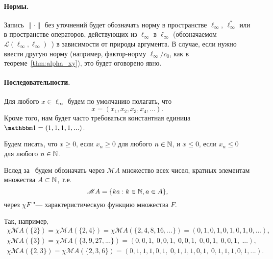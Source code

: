 \paragraph{Нормы.}
Запись $\|\cdot\|$ без уточнений будет обозначать норму в пространстве $\ell_\infty$, $\ell_\infty^*$
или в пространстве операторов, действующих из $\ell_\infty$ в $\ell_\infty$ (обозначаемом $\mathcal L (\ell_\infty, \ell_\infty)$~)
в зависимости от природы аргумента.
В случае, если нужно ввести другую норму (например, фактор-норму $\ell_\infty / c_0$, как в теореме~\ref{thm:alpha_xy}),
это будет оговорено явно.


\paragraph{Последовательности.}
Для любого $x\in\ell_\infty$ будем по умолчанию полагать, что
\begin{equation}
	x=(x_1, x_2, x_3, x_4, ...)
	.
\end{equation}
Кроме того, нам будет часто требоваться константная единица $\one = (1, 1, 1, 1, ...)$.

Будем писать, что $x\geq 0$, если $x_n \geq 0$ для любого $n\in \mathbb{N}$, и $x\leq 0$, если $x_n \leq 0$ для любого $n\in \mathbb{N}$.

Вслед за~\cite{hall1992behrend} будем обозначать через $\mathscr{M}A$ множество всех чисел,
кратных элементам множества $A\subset\mathbb{N}$, т.е.
\begin{equation}
	\mathscr{M}A = \{ka: k\in\mathbb{N}, a\in A\}
	,
\end{equation}
через $\chi F$ "--- характеристическую функцию множества $F$.

Так, например,
\begin{gather}
	\chi \mathscr{M}\!A(\{2\}) = \chi \mathscr{M}\!A(\{2, 4\}) = \chi \mathscr{M}\!A(\{2,4,8,16,...\})
	= (0,1,0,1,0,1,0,1,0,...),
\\
	\chi \mathscr{M}\!A(\{3\}) = \chi \mathscr{M}\!A(\{3,9,27,...\}) = (0,0,1,\;0,0,1,\;0,0,1,\;0,0,1,\;0,0,1,\;...),
\\
	\chi \mathscr{M}\!A(\{2,3\}) = \chi \mathscr{M}\!A(\{2,3,6\}) = (0,1,1,1,0,1,\;0,1,1,1,0,1,\;0,1,1,1,0,1,...).
\end{gather}


